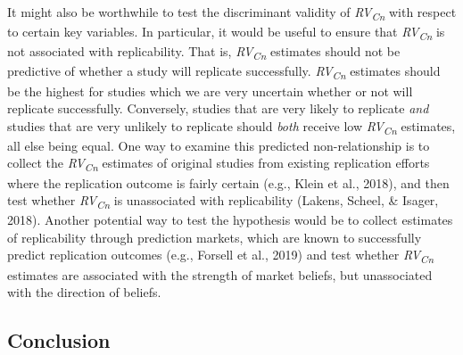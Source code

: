\documentclass[
  english,
  man,floatsintext]{apa6}
\begin{document}
It might also be worthwhile to test the discriminant validity of \emph{RV\textsubscript{Cn}} with respect to certain key variables. In particular, it would be useful to ensure that \emph{RV\textsubscript{Cn}} is not associated with replicability. That is, \emph{RV\textsubscript{Cn}} estimates should not be predictive of whether a study will replicate successfully. \emph{RV\textsubscript{Cn}} estimates should be the highest for studies which we are very uncertain whether or not will replicate successfully. Conversely, studies that are very likely to replicate \emph{and} studies that are very unlikely to replicate should \emph{both} receive low \emph{RV\textsubscript{Cn}} estimates, all else being equal. One way to examine this predicted non-relationship is to collect the \emph{RV\textsubscript{Cn}} estimates of original studies from existing replication efforts where the replication outcome is fairly certain (e.g., Klein et al., 2018), and then test whether \emph{RV\textsubscript{Cn}} is unassociated with replicability (Lakens, Scheel, \& Isager, 2018). Another potential way to test the hypothesis would be to collect estimates of replicability through prediction markets, which are known to successfully predict replication outcomes (e.g., Forsell et al., 2019) and test whether \emph{RV\textsubscript{Cn}} estimates are associated with the strength of market beliefs, but unassociated with the direction of beliefs.

\hypertarget{conclusion}{%
\subsection{Conclusion}\label{conclusion}}
\end{document}
